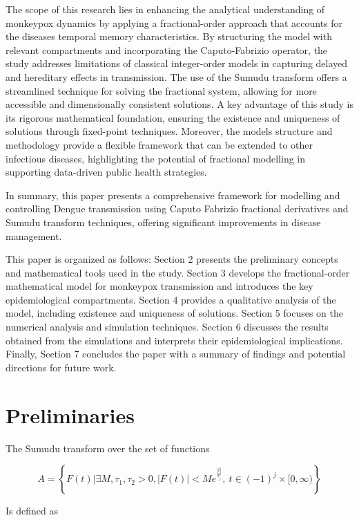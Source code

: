 \documentclass[10pt]{NSP1}
\begin{document}
The scope of this research lies in enhancing the analytical understanding of monkeypox dynamics by applying a fractional-order approach that accounts for the disease\textquotesingle s temporal memory characteristics. By structuring the model with relevant compartments and incorporating the Caputo-Fabrizio operator, the study addresses limitations of classical integer-order models in capturing delayed and hereditary effects in transmission. The use of the Sumudu transform offers a streamlined technique for solving the fractional system, allowing for more accessible and dimensionally consistent solutions. A key advantage of this study is its rigorous mathematical foundation, ensuring the existence and uniqueness of solutions through fixed-point techniques. Moreover, the model\textquotesingle s structure and methodology provide a flexible framework that can be extended to other infectious diseases, highlighting the potential of fractional modelling in supporting data-driven public health strategies.

In summary, this paper presents a comprehensive framework for modelling and controlling Dengue transmission using Caputo Fabrizio fractional derivatives and Sumudu transform techniques, offering significant improvements in disease management.

This paper is organized as follows: Section 2 presents the preliminary concepts and mathematical tools used in the study. Section 3 develops the fractional-order mathematical model for monkeypox transmission and introduces the key epidemiological compartments. Section 4 provides a qualitative analysis of the model, including existence and uniqueness of solutions. Section 5 focuses on the numerical analysis and simulation techniques. Section 6 discusses the results obtained from the simulations and interprets their epidemiological implications. Finally, Section 7 concludes the paper with a summary of findings and potential directions for future work.

\section{Preliminaries}

The Sumudu transform over the set of functions

\[
A = \left\{ F(t)|\exists M,\tau_{1},\tau_{2} > 0,\left| F(t) \right| < Me^{\frac{|t|}{\tau_{j}}},\ t \in ( - 1)^{j} \times \lbrack 0,\infty) \right\}
\]

Is defined as
\end{document}
